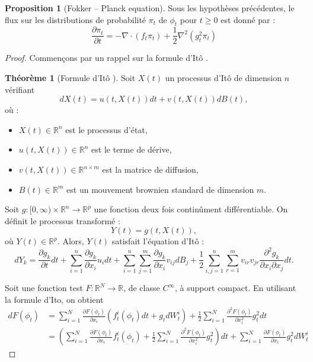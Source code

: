 \documentclass[a4paper,10pt]{article}
\theoremstyle{definition} %
\theoremstyle{definition} %
\newtheorem{proposition}[definition]{Proposition}
\theoremstyle{definition} %
\newtheorem{theorem}[definition]{Théorème}
\theoremstyle{definition} %
\begin{document}
\begin{proposition}[Fokker – Planck equation] 
Sous les hypothèses précédentes, le flux sur les distributions de probabilité $\pi_t$ de $\phi_t$ pour $t \geq 0$ est donné par :
    \begin{equation}\label{eq:Fokker-Planck}
        \frac{\partial\pi_t}{\partial t} = -\nabla \cdot (f_t \pi_t) + \frac{1}{2}\nabla^2(g_t^2\pi_t)
    \end{equation}
\end{proposition}
\begin{proof}
Commençons par un rappel sur la formule d'Itô . 
\begin{theorem}[Formule d'Itô \cite{Oksendal2003}]
Soit \( X(t) \) un processus d’Itô de dimension \( n \) vérifiant  
\[
dX(t) = u(t, X(t)) dt + v(t, X(t)) dB(t),
\]
où :
\begin{itemize}
    \item \( X(t) \in \mathbb{R}^n \) est le processus d’état,
    \item \( u(t, X(t)) \in \mathbb{R}^n \) est le terme de dérive,
    \item \( v(t, X(t)) \in \mathbb{R}^{n \times m} \) est la matrice de diffusion,
    \item \( B(t) \in \mathbb{R}^m \) est un mouvement brownien standard de dimension \( m \).
\end{itemize}

Soit \( g: [0, \infty) \times \mathbb{R}^n \to \mathbb{R}^p \) une fonction deux fois continûment différentiable.  
On définit le processus transformé :
\[
Y(t) = g(t, X(t)),
\]
où \( Y(t) \in \mathbb{R}^p \).  
Alors, \( Y(t) \) satisfait l’équation d’Itô :
\[
dY_k = \frac{\partial g_k}{\partial t} dt 
+ \sum_{i=1}^{n} \frac{\partial g_k}{\partial x_i} u_i dt 
+ \sum_{i=1}^{n} \sum_{j=1}^{m} \frac{\partial g_k}{\partial x_i} v_{ij} dB_j
+ \frac{1}{2} \sum_{i,j=1}^{n} \sum_{r=1}^{m} v_{ir} v_{jr} \frac{\partial^2 g_k}{\partial x_i \partial x_j} dt.
\]
\end{theorem}
\vspace{3em}



Soit une fonction test $F: \mathbb{R}^N \rightarrow \mathbb{R}$, de classe $C^{\infty}$, à support compact. En utilisant la formule d'Ito, on obtient
\begin{align*}
    dF(\phi_t) &= \sum_{i=1}^N \frac{\partial F(\phi_t)}{\partial x_i} (f^i_t(\phi_t)dt + g_tdW^i_t) + \frac{1}{2} \sum_{i=1}^N  \frac{\partial^2 F(\phi_t)}{\partial x_i^2} g_t^2 dt \\
    &= \left(\sum_{i=1}^N \frac{\partial F(\phi_t)}{\partial x_i} f^i_t(\phi_t) + \frac{1}{2} \sum_{i=1}^N  \frac{\partial^2 F(\phi_t)}{\partial x_i^2} g_t^2\right)dt + \sum_{i=1}^N \frac{\partial F(\phi_t)}{\partial x_i}  g_t^2dW^i_t
\end{align*}


\end{proof}
\end{document}
